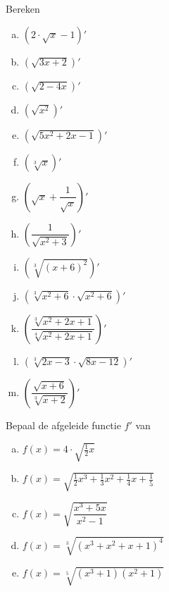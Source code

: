 \documentclass[a4paper,12pt]{article}
\begin{document}
\begin{oefening}
Bereken
\begin{multicols}{2}
\begin{enumerate}[(a)]
  \itemsep0.5em
  \item $\displaystyle\left(2\cdot\sqrt{x}-1\right)'$
  \item $\displaystyle\left(\sqrt{3x+2}\right)'$
  \item $\displaystyle\left(\sqrt{2-4x}\right)'$
  \item $\displaystyle\left(\sqrt{x^2}\right)'$
  \item $\displaystyle\left(\sqrt{5x^2+2x-1}\right)'$
  \item $\displaystyle\left(\sqrt[3]{x}\right)'$
  \item $\displaystyle\left(\sqrt{x}+\dfrac{1}{\sqrt{x}}\right)'$
  \item $\displaystyle\left(\dfrac{1}{\sqrt{x^2+3}}\right)'$
  \item $\displaystyle\left(\sqrt[3]{\left(x+6\right)^2}\right)'$
  \item $\displaystyle\left(\sqrt[3]{x^2+6}\cdot\sqrt{x^2+6}\right)'$
  \item $\displaystyle\left(\dfrac{\sqrt[3]{x^2+2x+1}}{\sqrt[4]{x^2+2x+1}}\right)'$
  \item $\displaystyle\left(\sqrt[3]{2x-3}\cdot\sqrt{8x-12}\right)'$
  \item $\displaystyle\left(\dfrac{\sqrt{x+6}}{\sqrt[3]{x+2}}\right)'$
\end{enumerate}
\end{multicols}
\end{oefening}

\begin{oefening}
Bepaal de afgeleide functie $f'$ van\\
\begin{enumerate}[(a)]
  \itemsep0.5em
  \item $\displaystyle f(x)=4\cdot\sqrt{\frac{1}{2}x}$
  \item $\displaystyle f(x)=\sqrt{\frac{1}{2}x^3+\frac{1}{3}x^2+\frac{1}{4}x+\frac{1}{5}}$
  \item $\displaystyle f(x)=\sqrt{\dfrac{x^3+5x}{x^2-1}}$
  \item $\displaystyle f(x)=\sqrt[3]{\left(x^3+x^2+x+1\right)^4}$
  \item $\displaystyle f(x)=\sqrt[5]{\left(x^3+1\right)\left(x^2+1\right)}$
\end{enumerate}
\end{oefening}
\end{document}
